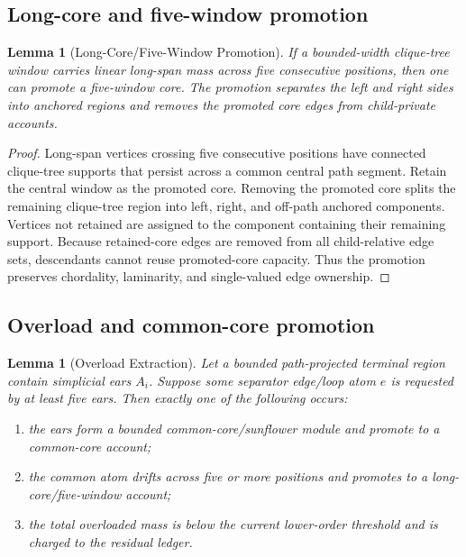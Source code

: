 \documentclass[11pt]{article}
\newtheorem{lemma}[theorem]{Lemma}
\theoremstyle{definition}
\begin{document}
\subsection{Long-core and five-window promotion}

\begin{lemma}[Long-Core/Five-Window Promotion]
\label{lem:long-core}
If a bounded-width clique-tree window carries linear long-span mass across five consecutive positions, then one can promote a five-window core. The promotion separates the left and right sides into anchored regions and removes the promoted core edges from child-private accounts.
\end{lemma}

\begin{proof}
Long-span vertices crossing five consecutive positions have connected clique-tree supports that persist across a common central path segment. Retain the central window as the promoted core. Removing the promoted core splits the remaining clique-tree region into left, right, and off-path anchored components. Vertices not retained are assigned to the component containing their remaining support. Because retained-core edges are removed from all child-relative edge sets, descendants cannot reuse promoted-core capacity. Thus the promotion preserves chordality, laminarity, and single-valued edge ownership.
\end{proof}

\subsection{Overload and common-core promotion}

\begin{lemma}[Overload Extraction]
\label{lem:overload-extraction}
Let a bounded path-projected terminal region contain simplicial ears \(A_i\). Suppose some separator edge/loop atom \(e\) is requested by at least five ears. Then exactly one of the following occurs:
\begin{enumerate}[label=(\roman*)]
    \item the ears form a bounded common-core/sunflower module and promote to a common-core account;
    \item the common atom drifts across five or more positions and promotes to a long-core/five-window account;
    \item the total overloaded mass is below the current lower-order threshold and is charged to the residual ledger.
\end{enumerate}
\end{lemma}
\end{document}
